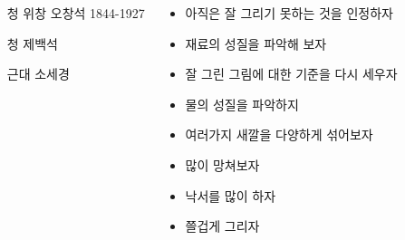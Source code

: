 \documentclass[	20pt, 
							a0paper, 
							landscape, %
							margin=0mm, %
							innermargin=4mm,  		%
							blockverticalspace=4mm, %
							colspace=5mm, 
							subcolspace=0mm
							]{tikzposter}
\begin{document}
\begin{columns}










		{
			\setlength{\leftmargini}{4em}			
			\setlength{\labelsep}{1em} %

			\begin{LARGE}
			\begin{itemize}
			\item [청] 위창 오창석 1844-1927
			\item [청] 제백석
			\item [근대] 소세경
			\end{itemize}
			\end{LARGE}

		}







			{				
			\setlength{\labelsep}{1em} %

			\begin{LARGE}
			\begin{itemize}
			\item 아직은 잘 그리기 못하는 것을 인정하자
			\item 재료의 성질을 파악해 보자
			\item 잘 그린 그림에 대한 기준을 다시 세우자
			\item 물의 성질을 파악하지
			\item 여러가지 새깔을 다양하게 섞어보자
			\item 많이 망쳐보자
			\item 낙서를 많이 하자
			\item 쯜겁게 그리자
			\end{itemize}
			\end{LARGE}
		}



\end{columns}
\end{document}
